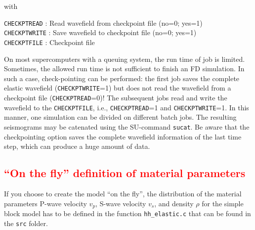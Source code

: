with

\texttt{CHECKPTREAD} : Read wavefield from checkpoint file (no=0; yes=1)\\
\texttt{CHECKPTWRITE} : Save wavefield to checkpoint file (no=0; yes=1)\\
\texttt{CHECKPTFILE} : Checkpoint file

On most supercomputers with a queuing system, the run time of job is limited. Sometimes, the allowed run time is not sufficient to finish an FD simulation. In such a case, check-pointing can be performed: the first job saves the complete elastic wavefield (\texttt{CHECKPTWRITE}=1) but does not read the wavefield from a checkpoint file (\texttt{CHECKPTREAD}=0)! The subsequent jobs read and write the wavefield to the \texttt{CHECKPTFILE}, i.e., \texttt{CHECKPTREAD}=1 and \texttt{CHECKPTWRITE}=1. In this manner, one simulation can be divided on different batch jobs. The resulting seismograms may be catenated using the SU-command \texttt{sucat}. Be aware that the checkpointing option saves the complete wavefield information of the last time step, which can produce a huge amount of data.

\textcolor{red}{\subsection{\enquote{On the fly} definition of material parameters}}
\label{model_def_func}
If you choose to create the model \enquote{on the fly}, the distribution of the material parameters P-wave velocity $v_p$, S-wave velocity $v_s$, and density $\rho$ for the simple block model has to be defined in the function \texttt{hh\_elastic.c} that can be found in the \texttt{src} folder.

